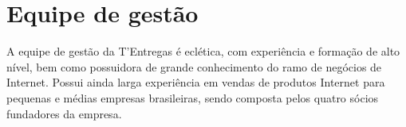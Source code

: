 \chapter{Equipe de gestão}
\label{chapter: Equipe de gestão}

\begin{commentA}

\par \end{commentA}


A equipe de gestão da T'Entregas é eclética, com experiência e formação de alto nível, bem
como possuidora de grande conhecimento do ramo de negócios de Internet. Possui ainda larga
experiência em vendas de produtos Internet para pequenas e médias empresas brasileiras, sendo
composta pelos quatro sócios fundadores da empresa.
